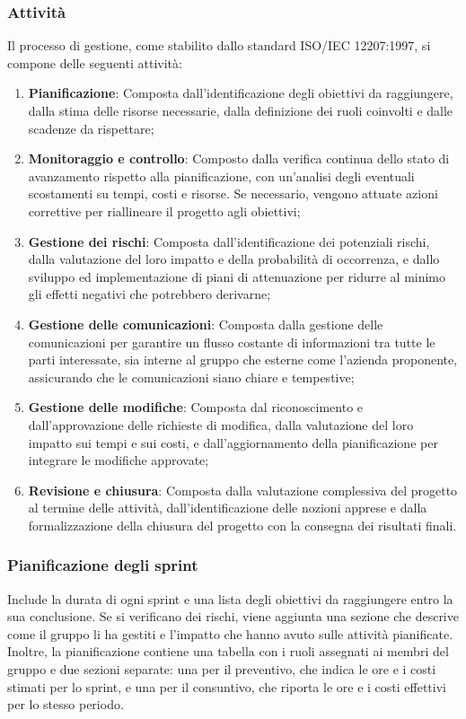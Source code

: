 \documentclass[10pt]{article}
\begin{document}
\begin{justify}
    \subsubsection{Attività}
    Il processo di gestione, come stabilito dallo standard ISO/IEC 12207:1997, si compone delle seguenti attività:
    \begin{enumerate}
        \item \textbf{Pianificazione}: Composta dall'identificazione degli obiettivi da raggiungere, dalla stima delle risorse necessarie, dalla definizione dei ruoli coinvolti e dalle scadenze da rispettare;
        \item \textbf{Monitoraggio e controllo}: Composto dalla verifica continua dello stato di avanzamento rispetto alla pianificazione, con un'analisi degli eventuali scostamenti su tempi, costi e risorse. Se necessario, vengono attuate azioni correttive per riallineare il progetto agli obiettivi;
        \item \textbf{Gestione dei rischi}: Composta dall'identificazione dei potenziali rischi, dalla valutazione del loro impatto e della probabilità di occorrenza, e dallo sviluppo ed implementazione di piani di attenuazione per ridurre al minimo gli effetti negativi che potrebbero derivarne;
        \item \textbf{Gestione delle comunicazioni}: Composta dalla gestione delle comunicazioni per garantire un flusso costante di informazioni tra tutte le parti interessate, sia interne al gruppo che esterne come l'azienda proponente, assicurando che le comunicazioni siano chiare e tempestive;
        \item \textbf{Gestione delle modifiche}: Composta dal riconoscimento e dall'approvazione delle richieste di modifica, dalla valutazione del loro impatto sui tempi e sui costi, e dall'aggiornamento della pianificazione per integrare le modifiche approvate;
        \item \textbf{Revisione e chiusura}: Composta dalla valutazione complessiva del progetto al termine delle attività, dall'identificazione delle nozioni apprese e dalla formalizzazione della chiusura del progetto con la consegna dei risultati finali.
    \end{enumerate}

    \subsubsection{Pianificazione degli sprint}
    Include la durata di ogni sprint e una lista degli obiettivi da raggiungere entro la sua conclusione. Se si verificano dei rischi, viene aggiunta una sezione che descrive come il gruppo li ha gestiti e l'impatto che hanno avuto sulle attività pianificate. Inoltre, la pianificazione contiene una tabella con i ruoli assegnati ai membri del gruppo e due sezioni separate: una per il preventivo, che indica le ore e i costi stimati per lo sprint, e una per il consuntivo, che riporta le ore e i costi effettivi per lo stesso periodo.


\end{justify}
\end{document}
